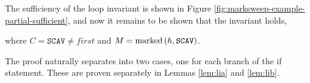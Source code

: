 \begin{lemma}
  The sufficiency of the loop invariant is shown in Figure
  \ref{fig:marksweep-example-partial-sufficient}, and now it remains
  to be shown that the invariant holds,

  \begin{prooftree}
  \end{prooftree}
  where $C = \mathtt{SCAV} \neq first$ and $M =
  \marked{h}{\mathtt{SCAV}}$.

  The proof naturally separates into two cases, one for each branch of
  the if statement. These are proven separately in Lemmas
  \ref{lem:lia} and \ref{lem:lib}.
  \label{lem:li}
\end{lemma}

